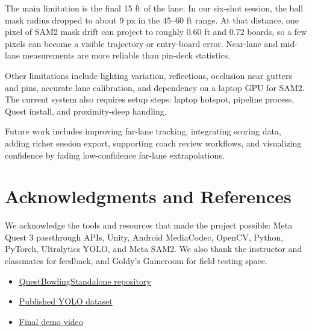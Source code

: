 \documentclass[11pt]{article}
\newcommand{\reportlink}[2]{\href{#1}{\textcolor{linkblue}{#2}}}
\begin{document}
The main limitation is the final 15 ft of the lane. In our six-shot session, the ball mask radius dropped to about 9 px in the 45--60 ft range. At that distance, one pixel of SAM2 mask drift can project to roughly 0.60 ft and 0.72 boards, so a few pixels can become a visible trajectory or entry-board error. Near-lane and mid-lane measurements are more reliable than pin-deck statistics.

Other limitations include lighting variation, reflections, occlusion near gutters and pins, accurate lane calibration, and dependency on a laptop GPU for SAM2. The current system also requires setup steps: laptop hotspot, pipeline process, Quest install, and proximity-sleep handling.

Future work includes improving far-lane tracking, integrating scoring data, adding richer session export, supporting coach review workflows, and visualizing confidence by fading low-confidence far-lane extrapolations.

\enlargethispage{4\baselineskip}
\section{Acknowledgments and References}

We acknowledge the tools and resources that made the project possible: Meta Quest 3 passthrough APIs, Unity, Android MediaCodec, OpenCV, Python, PyTorch, Ultralytics YOLO, and Meta SAM2. We also thank the instructor and classmates for feedback, and Goldy's Gameroom for field testing space.

\begin{itemize}[itemsep=0.15em,topsep=0.25em]
  \item \reportlink{https://github.com/sri299792458/QuestBowlingStandalone}{QuestBowlingStandalone repository}
  \item \reportlink{https://huggingface.co/datasets/sri299792458/quest-bowling-ball-yolo}{Published YOLO dataset}
  \item \reportlink{https://drive.google.com/file/d/1ChvX2wGKDNvMor3lKa0ZUYFAq08_IGWq/view}{Final demo video}
\end{itemize}
\end{document}
